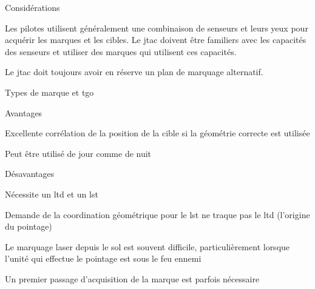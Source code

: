 				\item Considérations
				\eeeee
					\item Les pilotes utilisent généralement une combinaison de senseurs et leurs yeux pour acquérir les marques et les cibles. Le \gls{jtac} doivent être familiers avec les capacités des senseurs et utiliser des marques qui utilisent ces capacités.
					\item Le \gls{jtac} doit toujours avoir en réserve un plan de marquage alternatif.
				\ed
				\item Types de marque et \gls{tgo}
				\eeeee
					\eeeeee
						\item Avantages
						\eeeeeee
							\item Excellente corrélation de la position de la cible si la géométrie correcte est utilisée
							\item Peut être utilisé de jour comme de nuit
						\ed
						\item Désavantages
						\eeeeeee
							\item Nécessite un \gls{ltd} et un \gls{lst}
							\item Demande de la coordination géométrique pour le \gls{lst} ne traque pas le \gls{ltd} (l'origine du pointage)
							\item Le marquage laser depuis le sol est souvent difficile, particulièrement lorsque l'unité qui effectue le pointage est sous le feu ennemi
							\item Un premier passage d'acquisition de la marque est parfois nécessaire
						\ed
					\ed
